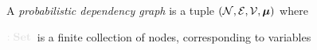 \documentclass{article}
\newcommand{\notation}[2][]{#1}
\renewcommand{\notation}[2][]{{\color{notationcolor} #2}}
\newcommand\Set{\textbf{Set}}
\newcommand{\N}{\mathcal N}
\newcommand{\modelname}{probabilistic dependency graph}
\newcommand{\MN}{PDG}
\numberwithin{equation}{section}
\begin{document}
	\begin{defn}[\MN]\label{def:model}
		A \emph{\modelname} is a tuple $\mnvars[]$ where
		\begin{description}[nosep]
			\item[$\N$] $\notation{:\Set}$~is a finite collection of nodes, corresponding to variables
			

\end{description}
\end{defn}
\end{document}
